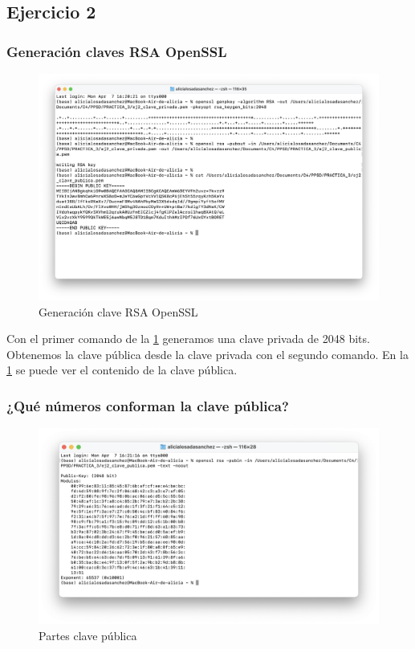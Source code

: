 \subsection{Ejercicio 2}
\graphicspath{ {img/02} }

\subsubsection{Generación claves RSA OpenSSL}

\begin{figure}[H]   
    \centering
    \includegraphics[width=\textwidth]{ej2_a.png}
    \caption{Generación clave RSA OpenSSL}
    \label{fig:generacion_rsa_openssl}
\end{figure}

Con el primer comando de la \ref{fig:generacion_rsa_openssl} generamos una clave privada de 2048 bits. Obtenemos la clave pública desde la clave privada con el segundo comando. En la \ref{fig:generacion_rsa_openssl} se puede ver el contenido de la clave pública. 


\subsubsection{¿Qué números conforman la clave pública?}

\begin{figure}[H]   
    \centering
    \includegraphics[width=\textwidth]{ej2_b.png}
    \caption{Partes clave pública}
    \label{fig:partes_clave_publica_rsa_openssl}
\end{figure}

